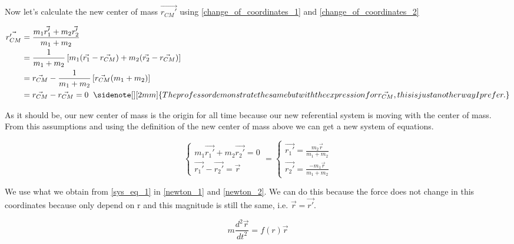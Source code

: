 Now let's calculate the new center of mass $\vec{r_{CM}'}$ using \ref{change_of_coordinates_1} and \ref{change_of_coordinates_2}

\begin{equation}
    \label{cm_prima}
    \begin{split}
    \vec{r_{CM}'} & = \frac{m_1\vec{r_1'}+ m_2\vec{r_2'}}{m_1+m_2} \\
                  & = \frac{1}{m_1 + m_2} \left[ m_1(\vec{r_1}-\vec{r_{CM}}) + m_2(\vec{r_2}-\vec{r_{CM}})\right] \\
                  & = \vec{r_{CM}} - \frac{1}{m_1+m_2}\left[\vec{r_{CM}}(m_1+ m_2)\right]\\
                  & = \vec{r_{CM}} - \vec{r_{CM}} = 0 \hspace{2mm} \sidenote[][2mm]{The professor demonstrate the same but with the expression for \vec{r_{CM}}, this is just another way I prefer.} 
    \end{split}              
\end{equation}

As it should be, our new center of mass is the origin for all time because our new referential system is moving with the center of mass. From this assumptions and using the definition of the new center of mass above we can get a new system of equations.

\begin{equation}
\label{sys_eq_1}
    \left\{
    \begin{array}{l}
        m_1\vec{r_1'} + m_2\vec{r_2'} = 0 \\
        \vec{r_1'} - \vec{r_2'} = \vec{r}
    \end{array}
    \right. =
    \left\{
    \begin{array}{l}
        \vec{r_1'} = \frac{m_2\vec{r}}{m_1+m_2} \\
        \vec{r_2'} = \frac{-m_1\vec{r}}{m_1+m_2}
    \end{array}
    \right.
\end{equation}

 We use what we obtain from \ref{sys_eq_1} in \ref{newton_1} and \ref{newton_2}. We can do this because the force does not change in this coordinates because only depend on r and this magnitude is still the same, i.e. $\vec{r}=\vec{r'}$.

\begin{equation}
\label{sys_eq_sol}
    m \frac{d^2\vec{r}}{dt^2} = f(r) \vec{r} 
\end{equation}

